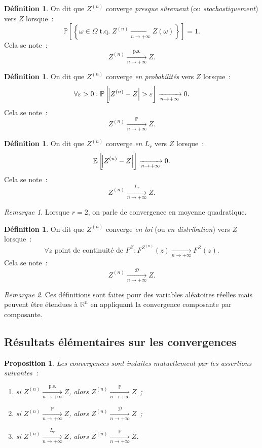 \documentclass{report}
\DeclareMathOperator{\tq}{\text{ t.q. }}
\renewcommand{\P}{\mathbb P}
\newcommand{\E}{\mathbb E}
\newcommand{\pinfty}{{+\infty}}
\newcommand{\cvgp}{\xrightarrow[n \to \pinfty]{\P}}
\newcommand{\cvgLr}{\xrightarrow[n \to \pinfty]{L_r}}
\newcommand{\cvgd}{\xrightarrow[n \to \pinfty]{\mathcal D}}
\newcommand{\cvgps}{\xrightarrow[n \to \pinfty]{\text{p.s.}}}
\newcommand{\R}{\mathbb R}
\newtheorem{prp}[thm]{Proposition}
\theoremstyle{definition}
\newtheorem{déf}[thm]{Définition}
\theoremstyle{remark}
\newtheorem*{rmq}{Remarque}
\begin{document}
			\begin{déf} On dit que $Z^{(n)}$ converge \textit{presque sûrement} (ou \textit{stochastiquement}) vers $Z$ lorsque~:
			\[\P\left[\left\{\omega \in \Omega \tq Z^{(n)} \xrightarrow[n \to \pinfty]{} Z(\omega)\right\}\right] = 1.\]
			Cela se note~:
			\[Z^{(n)} \cvgps Z.\]
			\end{déf}
		
			\begin{déf} On dit que $Z^{(n)}$ converge \textit{en probabilités} vers $Z$ lorsque~:
			\[\forall \varepsilon > 0 : \P\left[\abs {Z^{(n)} - Z} > \varepsilon\right] \xrightarrow[n \to \pinfty]{} 0.\]
			Cela se note~:
			\[Z^{(n)} \cvgp Z.\]
			\end{déf}
		
			\begin{déf} On dit que $Z^{(n)}$ converge \textit{en $L_r$} vers $Z$ lorsque~:
			\[\E\left[\abs {Z^{(n)} - Z}\right] \xrightarrow[n \to \pinfty]{} 0.\]
			Cela se note~:
			\[Z^{(n)} \cvgLr Z.\] 
			\end{déf}
		
			\begin{rmq} Lorsque $r=2$, on parle de convergence en moyenne quadratique.
			\end{rmq}
			
			\begin{déf} On dit que $Z^{(n)}$ converge \textit{en loi} (ou \textit{en distribution}) vers $Z$ lorsque~:
			\[\forall z \text{ point de continuité de }F^Z : F^{Z^{(n)}}(z) \xrightarrow[n \to \pinfty]{} F^Z(z).\]
			Cela se note~:
			\[Z^{(n)} \cvgd Z.\]
			\end{déf}
			
			\begin{rmq} Ces définitions sont faites pour des variables aléatoires réelles mais peuvent être étendues à $\R^n$ en appliquant la convergence composante
			par composante.
			\end{rmq}
			
		\subsection{Résultats élémentaires sur les convergences}
			\begin{prp} Les convergences sont induites mutuellement par les assertions suivantes~:
			\begin{enumerate}
				\item si $Z^{(n)} \cvgps Z$, alors $Z^{(n)} \cvgp Z$~;
				\item si $Z^{(n)} \cvgp Z$, alors $Z^{(n)} \cvgd Z$~;
				\item si $Z^{(n)} \cvgLr Z$, alors $Z^{(n)} \cvgp Z$.
			\end{enumerate}
			\end{prp}
			
\end{document}
